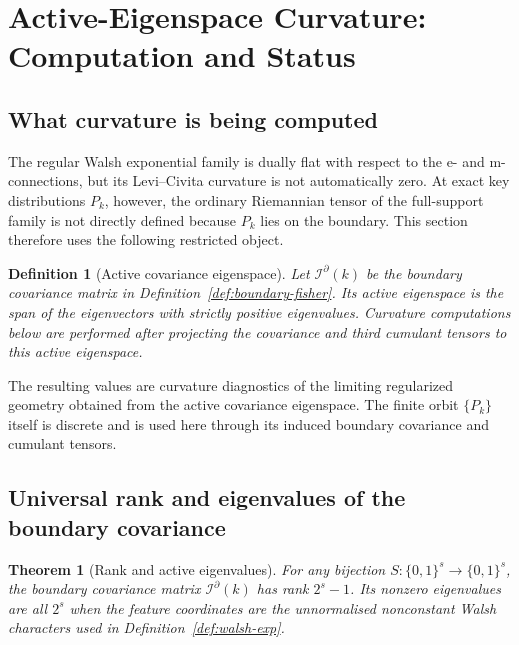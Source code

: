 \documentclass[referee,lineno,pdflatex,sn-mathphys-num]{sn-jnl}
\theoremstyle{thmstylethree}
\newtheorem{definition}{Definition}[section]
\theoremstyle{thmstyletwo}
\theoremstyle{thmstyleone}
\newtheorem{theorem}{Theorem}[section]
\newcommand{\B}[1]{\{0,1\}^{#1}}
\begin{document}
\section{Active-Eigenspace Curvature: Computation and Status}\label{sec:curvature}

\subsection{What curvature is being computed}\label{subsec:curvature-status}

The regular Walsh exponential family is dually flat with respect to the e- and
m-connections, but its Levi--Civita curvature is not automatically zero.  At
exact key distributions $P_k$, however, the ordinary Riemannian tensor of the
full-support family is not directly defined because $P_k$ lies on the boundary.
This section therefore uses the following restricted object.

\begin{definition}[Active covariance eigenspace]\label{def:active-eigenspace}
Let $\mathcal I^{\partial}(k)$ be the boundary covariance matrix in
Definition~\ref{def:boundary-fisher}.  Its active eigenspace is the span of the
eigenvectors with strictly positive eigenvalues.  Curvature computations below
are performed after projecting the covariance and third cumulant tensors to this
active eigenspace.
\end{definition}

The resulting values are curvature diagnostics of the limiting regularized
geometry obtained from the active covariance eigenspace.  The finite orbit
$\{P_k\}$ itself is discrete and is used here through its induced boundary
covariance and cumulant tensors.

\subsection{Universal rank and eigenvalues of the boundary covariance}\label{subsec:rank-eigen}

\begin{theorem}[Rank and active eigenvalues]\label{thm:active-rank}
For any bijection $S:\B{s}\to\B{s}$, the boundary covariance matrix
$\mathcal I^{\partial}(k)$ has rank $2^s-1$.  Its nonzero eigenvalues are all
$2^s$ when the feature coordinates are the unnormalised nonconstant Walsh
characters used in Definition~\ref{def:walsh-exp}.
\end{theorem}
\end{document}
